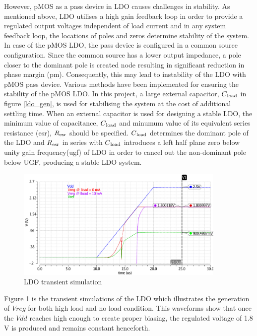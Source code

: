 \documentclass[12pt,a4paper,UKenglish]{article}
\begin{document}
However, pMOS as a pass device in LDO causes challenges in stability. As mentioned above, LDO utilises a high gain feedback loop in order to provide a regulated output voltages independent of load current and in any system feedback loop, the locations of poles and zeros determine stability of the system.  In case of the pMOS LDO, the pass device is configured in a common source configuration. Since the common source has a lower output impedance, a pole closer to the dominant pole is created node resulting in significant  reduction in phase margin (\acrshort{pm}). Consequently, this may lead to instability of the LDO with pMOS pass device.  Various methods have been implemented for ensuring the stability of the pMOS LDO. In this project, a large external capacitor, $C\textsubscript{load}$ in figure \ref{ldo_gen}, is used for stabilising the system at the cost of additional settling time. When an external capacitor is used for designing a stable LDO, the minimum value of capacitance, $C\textsubscript{load}$ and minumum value of its equivalent series resistance (\acrshort{esr}), $R\textsubscript{esr}$ should be specified\cite{ldo_ti_stability}. $C\textsubscript{load}$ determines the dominant pole of the LDO and $R\textsubscript{esr}$ in series with $C\textsubscript{load}$ introduces a left half plane zero below unity gain frequency(\acrshort{ugf}) of LDO in order to cancel out the non-dominant pole below UGF, producing a stable LDO system. \\

\begin{figure}[htbp] %
   \centering
   \includegraphics[width=0.9\textwidth]{img/ldo_tran.pdf} 
   \caption{LDO transient simulation}
   \label{ldo_tran}
\end{figure}

Figure \ref{ldo_tran} is the transient simulations of the LDO which illustrates the generation of $Vreg$ for both high load and no load condition. This waveforms show that once the $Vdd$ reaches high enough to create proper biasing, the regulated voltage of 1.8 V is produced and remains constant henceforth.
\end{document}
